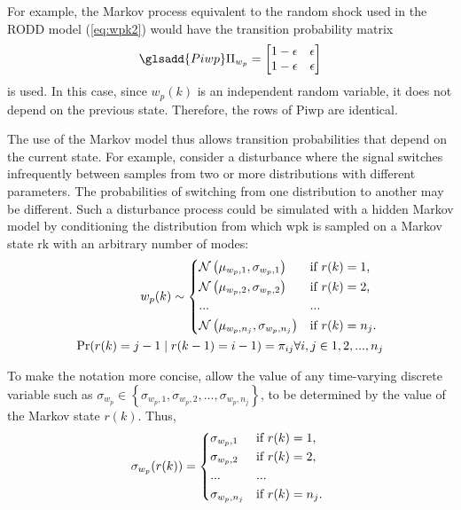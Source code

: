 For example, the Markov process equivalent to the random shock used in the RODD model (\ref{eq:wpk2}) would have the transition probability matrix
\begin{equation} \label{eq:Pi-RODD-step}
	\glsadd{Piwp}\Pi_{w_{p}} = \begin{bmatrix}
	1-\epsilon & \epsilon \\
	1-\epsilon & \epsilon
	\end{bmatrix}
\end{equation}
is used. In this case, since $w_{p}(k)$ is an independent random variable, it does not depend on the previous state. Therefore, the rows of \gls{Piwp} are identical.

The use of the Markov model thus allows transition probabilities that depend on the current state. For example, consider a disturbance where the signal switches infrequently between samples from two or more distributions with different parameters. The probabilities of switching from one distribution to another may be different. Such a disturbance process could be simulated with a hidden Markov model by conditioning the distribution from which \gls{wpk} is sampled on a Markov state \gls{rk} with an arbitrary number of modes:
\begin{equation} \label{eq:mog-example}
	\begin{split}
		w_p(k) \sim 
		\begin{cases*}
			\mathcal{N}\left(\mu_{w_p,1}, \sigma_{w_p,1}\right) & if $r(k)=1$, \\
			\mathcal{N}\left(\mu_{w_p,2}, \sigma_{w_p,2}\right) & if $r(k)=2$, \\
			... & ...\\
			\mathcal{N}\left(\mu_{w_p,n_j}, \sigma_{w_p,n_j}\right) & if $r(k)=n_j$.
		\end{cases*} \\
	\Pr(r(k)=j-1 \mid r(k-1)=i-1)=\pi_{ij} \forall i,j \in {1,2,...,n_j}
	\end{split}
\end{equation}

To make the notation more concise, allow the value of any time-varying discrete variable such as $\sigma_{w_p} \in \left\{\sigma_{w_p,1}, \sigma_{w_p,2},..., \sigma_{w_p,n_j}\right\}$, to be determined by the value of the Markov state $r(k)$. Thus,
\begin{equation} \label{eq:A-selection}
	\sigma_{w_p}(r(k)) = 
	\begin{cases*}
		\sigma_{w_p,1} & if $r(k)=1$, \\
		\sigma_{w_p,2} & if $r(k)=2$, \\
		... & ...\\
		\sigma_{w_p,n_j} & if $r(k)=n_j$.
	\end{cases*}
\end{equation}


